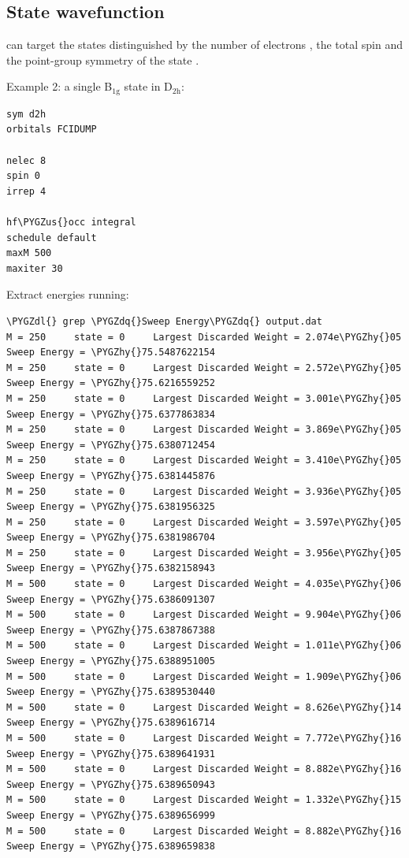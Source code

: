 \documentclass[letterpaper,10pt,english]{sphinxmanual}
\def\PYGZus{\char`\_}
\def\PYGZdl{\char`\$}
\def\PYGZhy{\char`\-}
\def\PYGZdq{\char`\"}
\begin{document}
\subsection{State wavefunction}
\label{examples:state-wavefunction}
 can target the states distinguished by the number of electrons , the total spin  and the point-group symmetry of the state .

Example 2: a single B$_{\text{1g}}$ state in D$_{\text{2h}}$:

\begin{Verbatim}[commandchars=\\\{\}]
sym d2h
orbitals FCIDUMP

nelec 8
spin 0
irrep 4

hf\PYGZus{}occ integral
schedule default
maxM 500
maxiter 30
\end{Verbatim}

Extract energies running:

\begin{Verbatim}[commandchars=\\\{\}]
\PYGZdl{} grep \PYGZdq{}Sweep Energy\PYGZdq{} output.dat
M = 250     state = 0     Largest Discarded Weight = 2.074e\PYGZhy{}05  Sweep Energy = \PYGZhy{}75.5487622154
M = 250     state = 0     Largest Discarded Weight = 2.572e\PYGZhy{}05  Sweep Energy = \PYGZhy{}75.6216559252
M = 250     state = 0     Largest Discarded Weight = 3.001e\PYGZhy{}05  Sweep Energy = \PYGZhy{}75.6377863834
M = 250     state = 0     Largest Discarded Weight = 3.869e\PYGZhy{}05  Sweep Energy = \PYGZhy{}75.6380712454
M = 250     state = 0     Largest Discarded Weight = 3.410e\PYGZhy{}05  Sweep Energy = \PYGZhy{}75.6381445876
M = 250     state = 0     Largest Discarded Weight = 3.936e\PYGZhy{}05  Sweep Energy = \PYGZhy{}75.6381956325
M = 250     state = 0     Largest Discarded Weight = 3.597e\PYGZhy{}05  Sweep Energy = \PYGZhy{}75.6381986704
M = 250     state = 0     Largest Discarded Weight = 3.956e\PYGZhy{}05  Sweep Energy = \PYGZhy{}75.6382158943
M = 500     state = 0     Largest Discarded Weight = 4.035e\PYGZhy{}06  Sweep Energy = \PYGZhy{}75.6386091307
M = 500     state = 0     Largest Discarded Weight = 9.904e\PYGZhy{}06  Sweep Energy = \PYGZhy{}75.6387867388
M = 500     state = 0     Largest Discarded Weight = 1.011e\PYGZhy{}06  Sweep Energy = \PYGZhy{}75.6388951005
M = 500     state = 0     Largest Discarded Weight = 1.909e\PYGZhy{}06  Sweep Energy = \PYGZhy{}75.6389530440
M = 500     state = 0     Largest Discarded Weight = 8.626e\PYGZhy{}14  Sweep Energy = \PYGZhy{}75.6389616714
M = 500     state = 0     Largest Discarded Weight = 7.772e\PYGZhy{}16  Sweep Energy = \PYGZhy{}75.6389641931
M = 500     state = 0     Largest Discarded Weight = 8.882e\PYGZhy{}16  Sweep Energy = \PYGZhy{}75.6389650943
M = 500     state = 0     Largest Discarded Weight = 1.332e\PYGZhy{}15  Sweep Energy = \PYGZhy{}75.6389656999
M = 500     state = 0     Largest Discarded Weight = 8.882e\PYGZhy{}16  Sweep Energy = \PYGZhy{}75.6389659838
\end{Verbatim}
\end{document}
